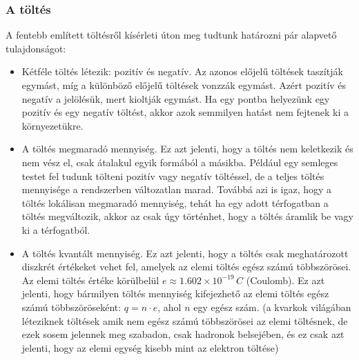 \documentclass[../main.tex]{subfiles}
\begin{document}
\subsubsection{A töltés}
A fentebb említett töltésről kísérleti úton meg tudtunk határozni pár alapvető tulajdonságot:
\begin{itemize}
    \item Kétféle töltés létezik: pozitív és negatív. Az azonos előjelű töltések taszítják egymást, míg a különböző előjelű töltések vonzzák egymást. Azért pozitív és negatív a jelölésük, mert kioltják egymást. Ha egy pontba helyezünk egy pozitív és egy negatív töltést, akkor azok semmilyen hatást nem fejtenek ki a környezetükre.
    \item A töltés megmaradó mennyiség. Ez azt jelenti, hogy a töltés nem keletkezik és nem vész el, csak átalakul egyik formából a másikba. Például egy semleges testet fel tudunk tölteni pozitív vagy negatív töltéssel, de a teljes töltés mennyisége a rendszerben változatlan marad. Továbbá azi is igaz, hogy a töltés lokálisan megmaradó mennyiség, tehát ha egy adott térfogatban a töltés megváltozik, akkor az csak úgy történhet, hogy a töltés áramlik be vagy ki a térfogatból.
    \item A töltés kvantált mennyiség. Ez azt jelenti, hogy a töltés csak meghatározott diszkrét értékeket vehet fel, amelyek az elemi töltés egész számú többszörösei. Az elemi töltés értéke körülbelül $e \approx 1.602 \times 10^{-19} \, C$ (Coulomb). Ez azt jelenti, hogy bármilyen töltés mennyiség kifejezhető az elemi töltés egész számú többszöröseként: $q = n \cdot e$, ahol $n$ egy egész szám. (a kvarkok világában léteziknek töltések amik nem egész számú többszörösei az elemi töltésnek, de ezek sosem jelennek meg szabadon, csak hadronok belsejében, és ez csak azt jelenti, hogy az elemi egység kisebb mint az elektron töltése)
\end{itemize}
\end{document}
